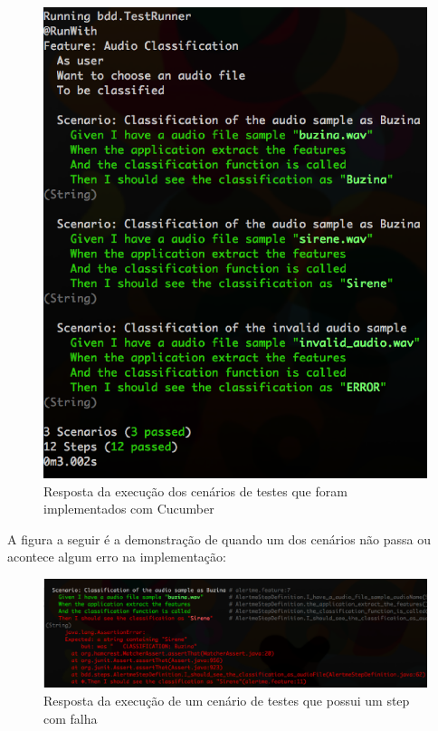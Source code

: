 \begin{figure}[H]
	\centering
	\captionsetup{justification=centering,margin=2cm}
	\includegraphics[scale=0.65]{capitulos/validacao/figuras/execucaoDoCucumberEtudoVerde.eps}
	\caption{Resposta da execução dos cenários de testes que foram implementados com Cucumber}
	\label{fig:result-engajamento}
\end{figure}

A figura a seguir é a demonstração de quando um dos cenários não passa ou acontece algum erro na implementação:

\begin{figure}[H]
	\centering
	\captionsetup{justification=centering,margin=2cm}
	\includegraphics[scale=0.65]{capitulos/validacao/figuras/execucaoDoCucumberComUmErro.eps}
	\caption{Resposta da execução de um cenário de testes que possui um step com falha}
	\label{fig:result-engajamento}
\end{figure}

